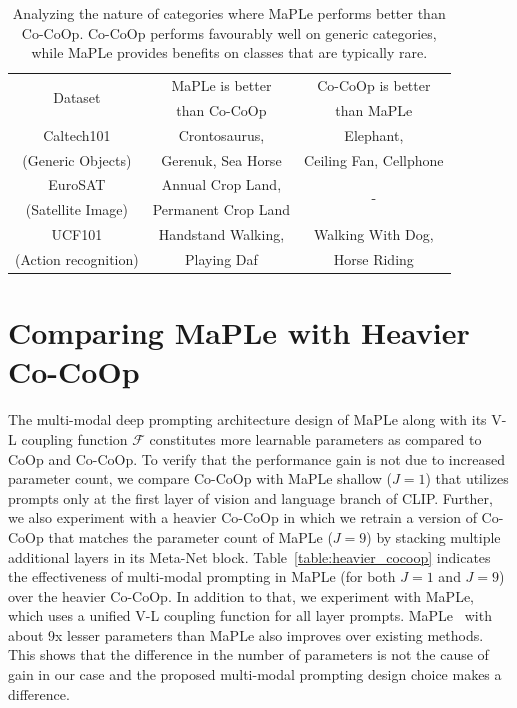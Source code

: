 \documentclass[10pt,twocolumn,letterpaper]{article}
\newcommand{\tablestyle}[2]{\setlength{\tabcolsep}{#1}\renewcommand{\arraystretch}{#2}\centering\footnotesize}
\begin{document}
\begin{table}[ht]
\tablestyle{8pt}{1.1}
\addtolength{\tabcolsep}{-3.7pt}
\centering
\begin{tabular}{ccc}
\toprule
\multirow{2}{*}{Dataset} & {MaPLe is better}  & {Co-CoOp is better} \\
  & {than  Co-CoOp}  & {than MaPLe} \\
\midrule
Caltech101 & Crontosaurus, & Elephant,\\
(Generic Objects) & Gerenuk, Sea Horse & Ceiling Fan, Cellphone \\
\midrule
EuroSAT & Annual Crop Land, & \multirow{2}{*}{-}\\
(Satellite Image) & Permanent Crop Land &		\\
\midrule
UCF101 & Handstand Walking, & Walking With Dog,\\
(Action recognition) & Playing Daf & Horse Riding	\\
\bottomrule
\end{tabular}
\caption{ 
Analyzing the nature of categories where MaPLe performs better than Co-CoOp. Co-CoOp performs favourably well on generic categories, while MaPLe provides benefits on classes that are typically rare.
} 
\label{table:class_category_analysis}
\end{table}





\section{Comparing MaPLe with Heavier Co-CoOp}
\label{appendix:heavier_cocoop}
 \noindent The multi-modal deep prompting architecture design of MaPLe along with its V-L coupling function $\mathcal{F}$ constitutes more learnable parameters as compared to CoOp and Co-CoOp. 
To verify that the performance gain is not due to increased parameter count, we compare Co-CoOp with MaPLe shallow ($J=1$) that utilizes prompts only at the first layer of vision and language branch of CLIP. Further, we also experiment with a heavier Co-CoOp in which we retrain a version of Co-CoOp that matches the parameter count of MaPLe ($J=9$) by stacking multiple additional layers in its Meta-Net block. Table~\ref{table:heavier_cocoop} indicates the effectiveness of multi-modal prompting in MaPLe (for both $J=1$ and $J=9$) over the heavier Co-CoOp. In addition to that, we experiment with MaPLe\dag, which uses a unified V-L coupling function for all layer prompts. MaPLe\dag~ with about 9x lesser parameters than MaPLe also improves over existing methods. This shows that the difference in the number of parameters is not the cause of gain in our case and the proposed multi-modal prompting design choice makes a difference.
\end{document}
